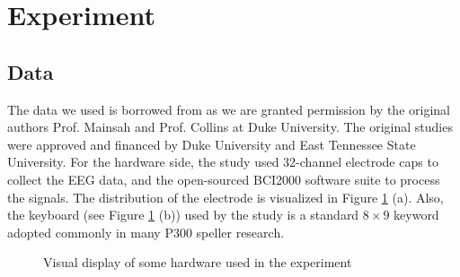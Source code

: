 \documentclass{article}
\begin{document}
\section{Experiment} \label{Experiment}
\subsection{Data} \label{Data}
The data we used is borrowed from \cite{mainsah2014utilizing} as we are granted permission by the original authors Prof. Mainsah and Prof. Collins at Duke University. The original studies were approved and financed by Duke University and East Tennessee State University. For the hardware side, the study used 32-channel electrode caps to collect the EEG data, and the open-sourced BCI2000 software suite to process the signals. The distribution of the electrode is visualized in Figure \ref{fig:7} (a). Also, the keyboard (see Figure \ref{fig:7} (b)) used by the study is a standard $8 \times 9$ keyword adopted commonly in many P300 speller research.

\vspace{-3mm}
\begin{figure}[H]
	\centering
	\qquad
	\hspace{-8mm}
	\caption{Visual display of some hardware used in the experiment}
	\label{fig:7}
\end{figure}
\end{document}
